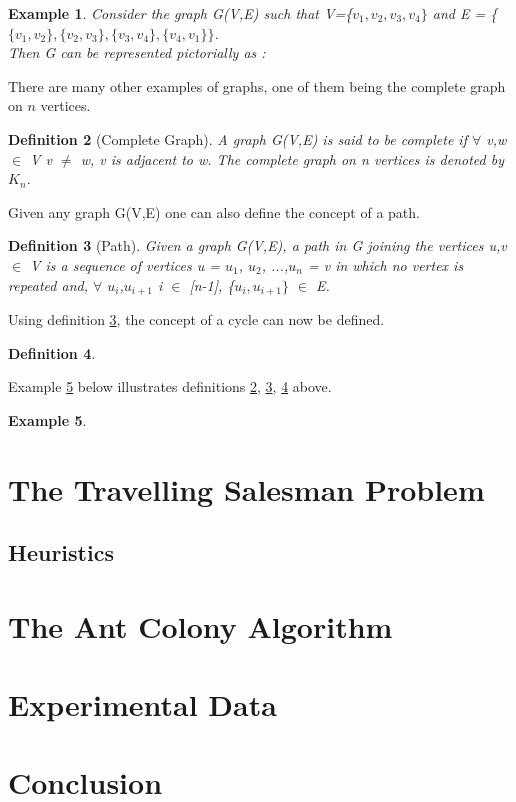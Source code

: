 \documentclass{article}
\newtheorem{definition}{Definition}[subsection]
\newtheorem{example}[definition]{Example}
\begin{document}
\begin{example}
\label{Example 1}
Consider the graph G(V,E) such that  V=\{$v_1, v_2, v_3, v_4\}$ and E = \{$\{v_1, v_2\}, \{v_2,v_3\}, \{v_3,v_4\}, \{v_4,v_1\}\}$.\\Then G can be represented pictorially as :\\

\end{example}
There are many other examples of graphs, one of them being the complete graph on $\mathit{n}$ vertices.
\begin{definition}[Complete Graph]
\label{Complete Graph}
A graph G(V,E) is said to be complete if $\forall$ v,w $\in$ V v $\neq$ w, v is adjacent to w. The complete graph on n vertices is denoted by $K_n$. 
\end{definition}
Given any graph G(V,E) one can also define the concept of a path.
\begin{definition}[Path]
\label{Path}
Given a graph G(V,E), a path in G joining the vertices u,v $\in$ V is a sequence of vertices u = $u_1$, $u_2$, ...,$u_n$ = v in which no vertex is repeated and, $\forall$ $u_i$,$u_{i+1}$ i $\in$ [n-1], \{$u_i,u_{i+1}\}$ $\in$ E. 
\end{definition}
Using definition \ref{Path}, the concept of a cycle can now be defined.
\begin{definition}
\label{cycle}
\end{definition}
Example \ref{example3} below illustrates definitions \ref{Complete Graph}, \ref{Path}, \ref{cycle} above.
\begin{example}
\label{example3}
\end{example} 
\newpage
\section{The Travelling Salesman Problem}
\subsection{Heuristics}
\section{The Ant Colony Algorithm}
\newpage
\section{Experimental Data}
\newpage
\section{Conclusion}
\newpage


\end{document}
